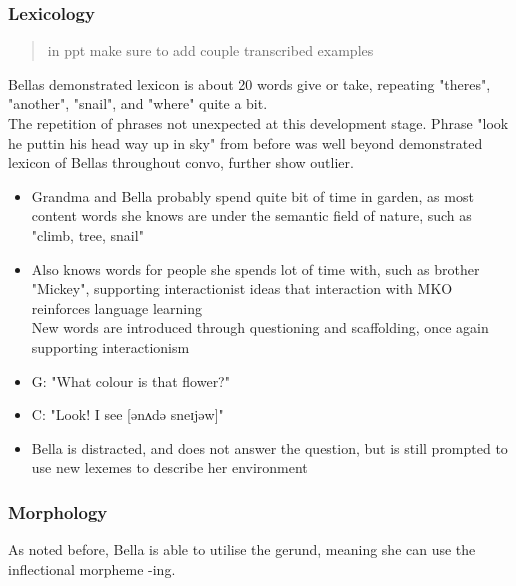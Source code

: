 \documentclass[
]{article}
\providecommand{\tightlist}{%
  \setlength{\itemsep}{0pt}\setlength{\parskip}{0pt}}
\begin{document}
\hypertarget{lexicology}{%
\subsubsection{Lexicology}\label{lexicology}}

\begin{quote}
in ppt make sure to add couple transcribed examples
\end{quote}

Bella\textquotesingle s demonstrated lexicon is about 20 words give or
take, repeating "there\textquotesingle s", "another", "snail", and
"where" quite a bit.\\
The repetition of phrases not unexpected at this development stage.
Phrase "look he puttin\textquotesingle{} his head way up in sky" from
before was well beyond demonstrated lexicon of Bella\textquotesingle s
throughout convo, further show outlier.

\begin{itemize}
\tightlist
\item
  Grandma and Bella probably spend quite bit of time in garden, as most
  content words she knows are under the semantic field of nature, such
  as "climb, tree, snail"
\item
  Also knows words for people she spends lot of time with, such as
  brother "Mickey", supporting interactionist ideas that interaction
  with MKO reinforces language learning\\
  New words are introduced through questioning and scaffolding, once
  again supporting interactionism
\item
  G: "What colour is that flower?"
\item
  C: "Look! I see {[}ənʌdə sneɪjəw{]}"
\item
  Bella is distracted, and does not answer the question, but is still
  prompted to use new lexemes to describe her environment
\end{itemize}

\hypertarget{morphology}{%
\subsubsection{Morphology}\label{morphology}}

As noted before, Bella is able to utilise the gerund, meaning she can
use the inflectional morpheme -ing.
\end{document}
